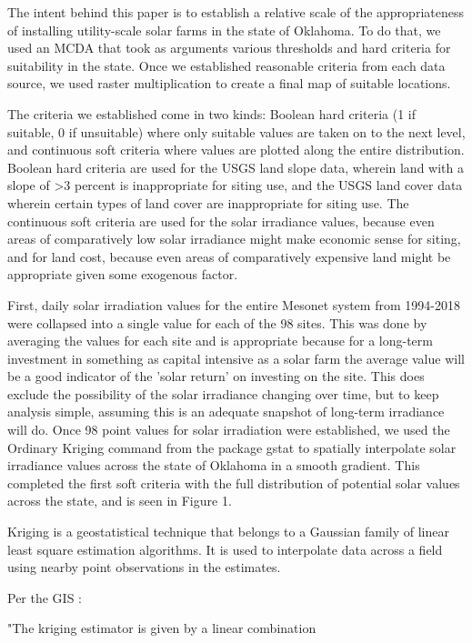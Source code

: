 \documentclass[12pt,english]{article}
\begin{document}
The intent behind this paper is to establish a relative scale of the appropriateness of installing utility-scale solar farms in the state of Oklahoma. To do that, we used an MCDA that took as arguments various thresholds and hard criteria for suitability in the state. Once we established reasonable criteria from each data source, we used raster multiplication to create a final map of suitable locations.  

The criteria we established come in two kinds: Boolean hard criteria (1 if suitable, 0 if unsuitable) where only suitable values are taken on to the next level, and continuous soft criteria where values are plotted along the entire distribution. Boolean hard criteria are used for the USGS land slope data, wherein land with a slope of >3 percent is inappropriate for siting use, and the USGS land cover data wherein certain types of land cover are inappropriate for siting use. The continuous soft criteria are used for the solar irradiance values, because even areas of comparatively low solar irradiance might make economic sense for siting, and for land cost, because even areas of comparatively expensive land might be appropriate given some exogenous factor.  

First, daily solar irradiation values for the entire Mesonet system from 1994-2018 were collapsed into a single value for each of the 98 sites. This was done by averaging the values for each site and is appropriate because for a long-term investment in something as capital intensive as a solar farm the average value will be a good indicator of the 'solar return' on investing on the site. This does exclude the possibility of the solar irradiance changing over time, but to keep analysis simple, assuming this is an adequate snapshot of long-term irradiance will do. Once 98 point values for solar irradiation were established, we used the  Ordinary Kriging command from the package gstat to spatially interpolate solar irradiance values across the state of Oklahoma in a smooth gradient. This completed the first soft criteria with the full distribution of potential solar values across the state, and is seen in Figure 1.  

Kriging is a geostatistical technique that belongs to a Gaussian family of linear least square estimation algorithms. It is used to interpolate data across a field using nearby point observations in the estimates. 

Per the GIS \citet{wiki}: 

"The kriging estimator is given by a linear combination
\end{document}
